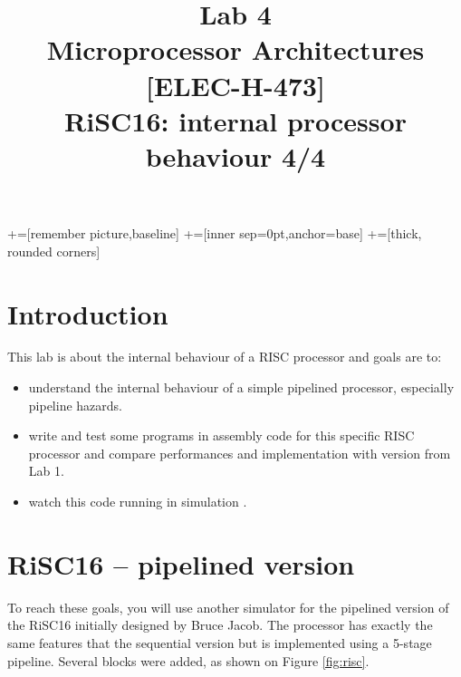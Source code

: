 \documentclass[10pt,a4paper]{article}
\date{\vspace{-1cm}\version}
\title{\vspace{-2cm} Lab 4\\ Microprocessor Architectures [ELEC-H-473]\\ RiSC16: internal processor behaviour 4/4 \ifthenelse{\boolean{corrige}}{~\\Corrigé}{}}
\theoremstyle{definition}%
\begin{document}
\newcommand\tabnode[1]{\addtocounter{nodecount}{1} \tikz \node (\arabic{nodecount}) {#1};}

+=[remember picture,baseline]
+=[inner sep=0pt,anchor=base]
+=[thick, rounded corners]



\maketitle
\section*{Introduction}

This lab is about the internal behaviour of a RISC processor and goals are to:
\begin{itemize}
\item understand the internal behaviour of a simple pipelined processor, especially pipeline hazards.
\item write and test some programs in assembly code for this specific RISC processor and compare performances and implementation  with version from Lab 1.
\item watch this code running in simulation .
\end{itemize}

\section{RiSC16 -- pipelined version}
To reach these goals, you will use another simulator for the pipelined version of the RiSC16 initially designed by Bruce Jacob. The processor has exactly the same features that the sequential version but is implemented using a 5-stage pipeline. Several blocks were added, as shown on Figure \vref{fig:risc}.
\end{document}
